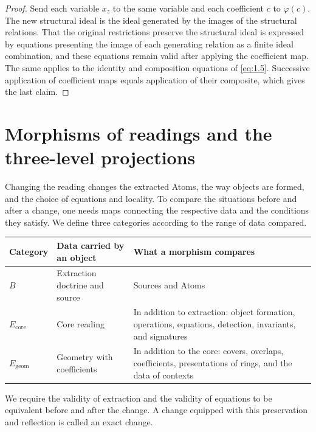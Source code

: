\begin{proof}

Send each variable $x_z$ to the same variable and each coefficient $c$ to
$\varphi(c)$.
The new structural ideal is the ideal generated by the images of the structural
relations.
That the original restrictions preserve the structural ideal is expressed by
equations presenting the image of each generating relation as a finite ideal
combination, and these equations remain valid after applying the coefficient
map.
The same applies to the identity and composition equations of \eqref{eq:1.5}.
Successive application of coefficient maps equals application of their
composite, which gives the last claim.

\end{proof}

\section{Morphisms of readings and the three-level projections}\label{sec:1.7}

Changing the reading changes the extracted Atoms, the way objects are formed,
and the choice of equations and locality.
To compare the situations before and after a change, one needs maps connecting
the respective data and the conditions they satisfy.
We define three categories according to the range of data compared.

\begin{xltabular}{\linewidth}{@{}LLL@{}}
\toprule
Category & Data carried by an object & What a morphism compares \\
\midrule
\endhead
$B$ & Extraction doctrine and source & Sources and Atoms \\
\addlinespace[3pt]
$E_{\mathrm{core}}$ & Core reading & In addition to extraction: object formation, operations, equations, detection, invariants, and signatures \\
\addlinespace[3pt]
$E_{\mathrm{geom}}$ & Geometry with coefficients & In addition to the core: covers, overlaps, coefficients, presentations of rings, and the data of contexts \\
\bottomrule
\end{xltabular}

We require the validity of extraction and the validity of equations to be
equivalent before and after the change.
A change equipped with this preservation and reflection is called an exact
change.

